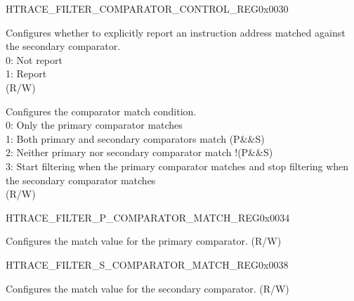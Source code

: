 \addtocounter{Regfloat}{-1}
\begin{register}{H}{TRACE\_FILTER\_COMPARATOR\_CONTROL\_REG}{0x0030}
\begin{regdesc}\begin{reglist}
\item [Continued from the previous page...]

\label{fielddesc:TRACESNOTIFY}\item [TRACE\_S\_NOTIFY] Configures whether to explicitly report an instruction address matched against the secondary comparator.\\
0: Not report\\
1: Report\\ (R/W)
\label{fielddesc:TRACEMATCHMODE}\item [TRACE\_MATCH\_MODE] Configures the comparator match condition.\\
0: Only the primary comparator matches\\
1: Both primary and secondary comparators match (P\&\&S)\\
2: Neither primary nor secondary comparator match !(P\&\&S)\\
3: Start filtering when the primary comparator matches and stop filtering when the secondary comparator matches\\ (R/W)
\end{reglist}\end{regdesc}
\end{register}


\begin{register}{H}{TRACE\_FILTER\_P\_COMPARATOR\_MATCH\_REG}{0x0034}\label{regdesc:TRACEFILTERPCOMPARATORMATCHREG}
%
\regnewline%
\begin{regdesc}\begin{reglist}
\label{fielddesc:TRACEPMATCH}\item [TRACE\_P\_MATCH] Configures the match value for the primary comparator. (R/W)
\end{reglist}\end{regdesc}
\end{register}


\begin{register}{H}{TRACE\_FILTER\_S\_COMPARATOR\_MATCH\_REG}{0x0038}\label{regdesc:TRACEFILTERSCOMPARATORMATCHREG}
%
\regnewline%
\begin{regdesc}\begin{reglist}
\label{fielddesc:TRACESMATCH}\item [TRACE\_S\_MATCH] Configures the match value for the secondary comparator. (R/W)
\end{reglist}\end{regdesc}
\end{register}


